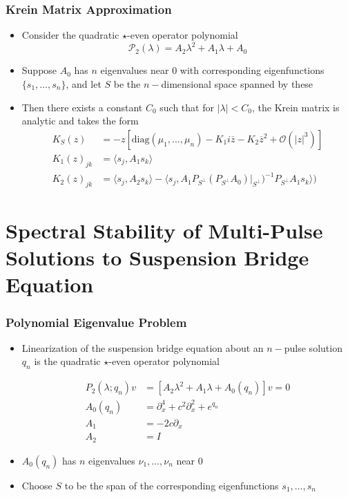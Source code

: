 \documentclass[16pt]{beamer}
\newcommand{\calP}{\mathcal{P}}
\begin{document}
\begin{frame}
\frametitle{Krein Matrix Approximation}
	\begin{lemma}[Kapitula et. al., 2019]
	\begin{itemize}
	\item Consider the quadratic $\star$-even operator polynomial
	\[ \calP_2(\lambda) = A_2 \lambda^2 + A_1 \lambda + A_0 \]
	\item Suppose $A_0$ has $n$ eigenvalues near 0 with corresponding eigenfunctions $\{s_1, \dots, s_n \}$, and let $S$ be the $n-$dimensional space spanned by these
	\item Then there exists a constant $C_0$ such that for $|\lambda| < C_0$, the Krein matrix is analytic and takes the form
	\begin{align*}
	K_S(z) &= -z\left[ \text{diag}(\mu_1, \dots, \mu_n) - K_1 i \overline{z} - K_2 \overline{z}^2 + \mathcal{O}(|z|^3)\right] \\
	K_1(z)_{jk} &= \langle s_j, A_1 s_k\rangle \\
	K_2(z)_{jk} &= \langle s_j, A_2 s_k\rangle -
	\langle s_j, A_1 P_{S^{\perp}} (P_{S^{\perp}} A_0)|_{S^{\perp}} )^{-1} P_{S^{\perp}} A_1 s_k \rangle \Big)
	\end{align*}
    \end{itemize}

	\end{lemma}
\end{frame}

\section{Spectral Stability of Multi-Pulse Solutions to Suspension Bridge Equation}

\begin{frame}
\frametitle{Polynomial Eigenvalue Problem}
	\begin{itemize}
	\item Linearization of the suspension bridge equation about an $n-$pulse solution $q_n$ is the quadratic $\star$-even operator polynomial

    \begin{align*}
    P_2(\lambda; q_n)v &= [A_2 \lambda^2 + A_1 \lambda + A_0(q_n)]v = 0 \\
    A_0(q_n) &= \partial_x^4 + c^2 \partial_x^2 + e^{q_n} \\
    A_1 &= -2 c \partial_x \\
    A_2 &= I
    \end{align*}

    \item $A_0(q_n)$ has $n$ eigenvalues $\nu_1, \dots, \nu_n$ near 0

    \item Choose $S$ to be the span of the corresponding eigenfunctions $s_1, \dots, s_n$
	\end{itemize}
\end{frame}
\end{document}
